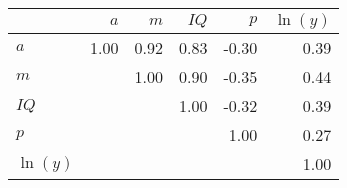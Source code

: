 \begin{tabular}{lrrrrr}
\hline
 & $a$  & $m$  & $IQ$  & $p$  & $\ln(y)$  \\
\hline
$a$ & 1.00  & 0.92  & 0.83  & -0.30  & 0.39  \\
$m$ &   & 1.00  & 0.90  & -0.35  & 0.44  \\
$IQ$ &   &   & 1.00  & -0.32  & 0.39  \\
$p$ &   &   &   & 1.00  & 0.27  \\
$\ln(y)$ &   &   &   &   & 1.00  \\
\hline
\end{tabular}%
